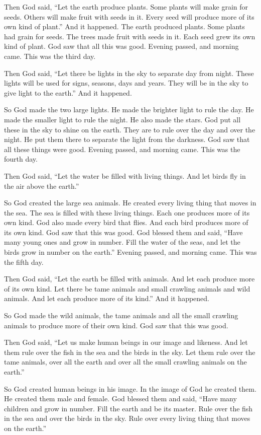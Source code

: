Then God said, “Let the earth produce plants. Some plants will make grain for seeds. Others will make fruit with seeds in it. Every seed will produce more of its own kind of plant.” And it happened. The earth produced plants. Some plants had grain for seeds. The trees made fruit with seeds in it. Each seed grew its own kind of plant. God saw that all this was good. Evening passed, and morning came. This was the third day.

Then God said, “Let there be lights in the sky to separate day from night. These lights will be used for signs, seasons, days and years. They will be in the sky to give light to the earth.” And it happened.

So God made the two large lights. He made the brighter light to rule the day. He made the smaller light to rule the night. He also made the stars. God put all these in the sky to shine on the earth. They are to rule over the day and over the night. He put them there to separate the light from the darkness. God saw that all these things were good. Evening passed, and morning came. This was the fourth day.

Then God said, “Let the water be filled with living things. And let birds fly in the air above the earth.”

So God created the large sea animals. He created every living thing that moves in the sea. The sea is filled with these living things. Each one produces more of its own kind. God also made every bird that flies. And each bird produces more of its own kind. God saw that this was good. God blessed them and said, “Have many young ones and grow in number. Fill the water of the seas, and let the birds grow in number on the earth.” Evening passed, and morning came. This was the fifth day.

Then God said, “Let the earth be filled with animals. And let each produce more of its own kind. Let there be tame animals and small crawling animals and wild animals. And let each produce more of its kind.” And it happened.

So God made the wild animals, the tame animals and all the small crawling animals to produce more of their own kind. God saw that this was good.

Then God said, “Let us make human beings in our image and likeness. And let them rule over the fish in the sea and the birds in the sky. Let them rule over the tame animals, over all the earth and over all the small crawling animals on the earth.”

So God created human beings in his image. In the image of God he created them. He created them male and female. God blessed them and said, “Have many children and grow in number. Fill the earth and be its master. Rule over the fish in the sea and over the birds in the sky. Rule over every living thing that moves on the earth.”

